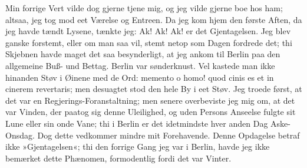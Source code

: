 \documentclass[12pt,a4paper]{article}
\begin{document}
Min forrige Vert vilde dog gjerne tjene mig, og jeg vilde gjerne boe hos ham; altsaa, jeg tog mod eet Værelse og Entreen. Da jeg kom hjem den første Aften, da jeg havde tændt Lysene, tænkte jeg: Ak! Ak! Ak! er det Gjentagelsen. Jeg blev ganske forstemt, eller om man saa vil, stemt netop som Dagen fordrede det; thi Skjebnen havde maget det saa besynderligt, at jeg ankom til Berlin paa den allgemeine Buß- und Bettag. Berlin var sønderknust. Vel kastede man ikke hinanden Støv i Øinene med de Ord: memento o homo! quod cinis es et in cinerem revertaris; men desuagtet stod den hele By i eet Støv. Jeg troede først, at det var en Regjerings-Foranstaltning; men senere overbeviste jeg mig om, at det var Vinden, der paatog sig denne Uleilighed, og uden Persons Anseelse fulgte sit Lune eller sin onde Vane; thi i Berlin er det idetmindste hver anden Dag Aske-Onsdag. Dog dette vedkommer mindre mit Forehavende. Denne Opdagelse betraf ikke »Gjentagelsen«; thi den forrige Gang jeg var i Berlin, havde jeg ikke bemærket dette Phænomen, formodentlig fordi det var Vinter.
\end{document}
